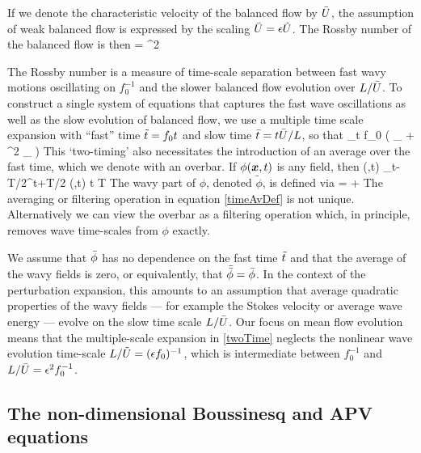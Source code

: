 \documentclass[12pt, oneside]{book}
\begin{document}
If we denote the characteristic velocity of the balanced flow by $\avU$, the assumption of weak balanced flow is expressed by the scaling $\avU = \ep \tU$.  The Rossby number of the balanced flow is then
\beq
\ro {} {} =  \ep^2 \per
\eeq

The Rossby number is a measure of time-scale separation between fast wavy motions oscillating on $f_0^{-1}$ and the slower balanced flow evolution over $L / \avU$.  To construct a single system of equations that captures the fast wave oscillations as well as the slow evolution of balanced flow, we use a multiple time scale expansion with ``fast'' time $\tt=f_0 t $ and slow time $\bt = t \avU /L$, so that
\beq
\p_t \mapsto f_0 \left(  \p_{\tt} + \ep^2 \p_{\bt} \right)\per
\label{twoTime}
\eeq
This `two-timing' also necessitates the introduction of an average over the fast time, which we denote with an overbar.  If $\phi(\bx,t)$ is any field, then
\beq
\av{\phi}(\bx,t)  {} \int_{t-T/2}^{t+T/2} \!\!\! \phi(\bx,t) \id t \com \quad {} \quad {} \ll T \ll {} \per
\label{timeAvDef}
\eeq
The  wavy part of $\phi$, denoted $\tilde \phi$, is defined via  
\beq
\phi =  \av{\phi} + \tilde \phi \per
\eeq
The averaging or filtering operation in equation \eqref{timeAvDef} is not unique.  Alternatively we can view the overbar as a filtering operation which, in principle, removes wave time-scales from $\phi$ exactly.  

We assume that $\av{\phi}$ has no dependence on the fast time $\tt$ and that the average of the wavy fields is zero, or equivalently, that $\av{\av{\phi}} = \av{\phi}$.  In the context of the perturbation expansion, this amounts to an assumption that average quadratic properties of the wavy fields --- for example the Stokes velocity or average wave energy --- evolve on the slow time scale $L / \avU$.  Our focus on mean flow evolution means that the multiple-scale expansion in \eqref{twoTime} neglects the nonlinear wave evolution time-scale $L / \tU = (\ep f_0)^{-1}$, which is intermediate between $f_0^{-1}$ and $L / \avU = \ep^2 f_0^{-1} $.

\subsection{The non-dimensional Boussinesq and APV equations}
\label{nonDimSec}
\end{document}
